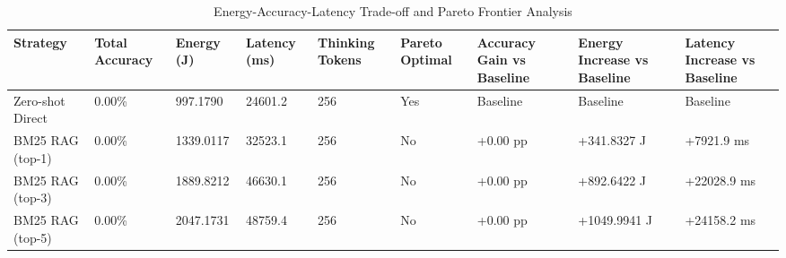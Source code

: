\begin{table}
\caption{Energy-Accuracy-Latency Trade-off and Pareto Frontier Analysis}
\label{tab:tradeoff_comparison}
\begin{tabular}{lllllllll}
\toprule
Strategy & Total Accuracy & Energy (J) & Latency (ms) & Thinking Tokens & Pareto Optimal & Accuracy Gain vs Baseline & Energy Increase vs Baseline & Latency Increase vs Baseline \\
\midrule
Zero-shot Direct & 0.00\% & 997.1790 & 24601.2 & 256 & Yes & Baseline & Baseline & Baseline \\
BM25 RAG (top-1) & 0.00\% & 1339.0117 & 32523.1 & 256 & No & +0.00 pp & +341.8327 J & +7921.9 ms \\
BM25 RAG (top-3) & 0.00\% & 1889.8212 & 46630.1 & 256 & No & +0.00 pp & +892.6422 J & +22028.9 ms \\
BM25 RAG (top-5) & 0.00\% & 2047.1731 & 48759.4 & 256 & No & +0.00 pp & +1049.9941 J & +24158.2 ms \\
\bottomrule
\end{tabular}
\end{table}
